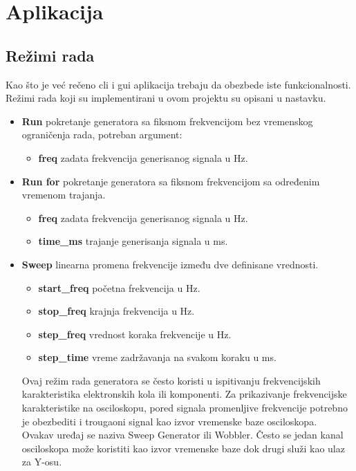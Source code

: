 \section{Aplikacija}

\subsection{Režimi rada}\label{working_modes}
Kao što je već rečeno \gls{cli} i \gls{gui} aplikacija trebaju da obezbede iste
funkcionalnosti.\\
Režimi rada koji su implementirani u ovom projektu su opisani u nastavku.
\begin{itemize}
\item \label{run_mode} \textbf{Run} pokretanje generatora sa fiksnom frekvencijom bez vremenskog
  ograničenja rada, potreban argument:
  \begin{itemize}
    \item \textbf{freq} zadata frekvencija generisanog signala u Hz.
  \end{itemize}
\item \label{run_for_mode} \textbf{Run for} pokretanje generatora sa fiksnom frekvencijom sa
  određenim vremenom trajanja.
  \begin{itemize}
  \item \textbf{freq} zadata frekvencija generisanog signala u Hz.
  \item \textbf{time\_ms} trajanje generisanja signala u ms.
  \end{itemize}

\item \label{sweep_mode} \textbf{Sweep} linearna promena frekvencije između dve definisane
  vrednosti.
  \begin{itemize}
  \item \textbf{start\_freq} početna frekvencija u Hz.
  \item \textbf{stop\_freq}  krajnja frekvencija u Hz.
  \item \textbf{step\_freq}  vrednost koraka frekvencije u Hz.
  \item \textbf{step\_time}  vreme zadržavanja na svakom koraku u ms.
  \end{itemize}
  Ovaj režim rada generatora se često koristi u ispitivanju frekvencijskih karakteristika
  elektronskih kola ili komponenti.
  Za prikazivanje frekvencijske karakteristike na osciloskopu, pored signala promenljive
  frekvencije potrebno je obezbediti i trougaoni signal kao izvor vremenske baze
  osciloskopa. \\
  Ovakav uređaj se naziva Sweep Generator ili Wobbler.
  Često se jedan kanal osciloskopa može koristiti kao izvor vremenske baze dok
  drugi služi kao ulaz za Y-osu.

\end{itemize}

